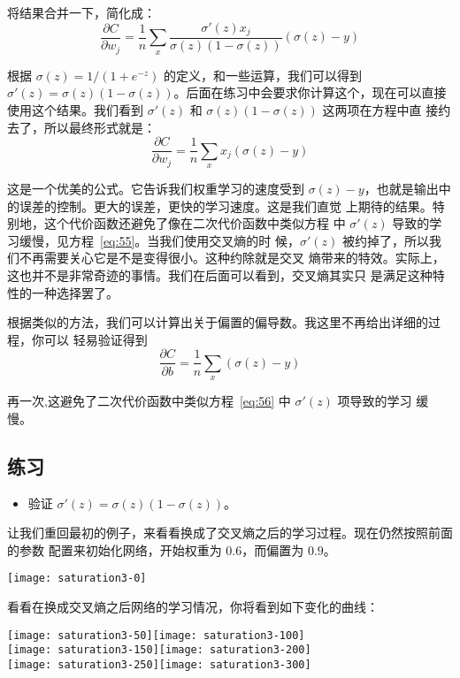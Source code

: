 将结果合并一下，简化成：
\begin{equation}
  \frac{\partial C}{\partial w_j} = \frac{1}{n} \sum_x \frac{\sigma'(z)
    x_j}{\sigma(z) (1-\sigma(z))} (\sigma(z)-y)
\label{eq:60}\tag{60}
\end{equation}

根据 $\sigma(z) = 1/(1+e^{-z})$ 的定义，和一些运算，我们可以得到
$\sigma'(z) = \sigma(z)(1-\sigma(z))$。后面在练习中会要求你计算这个，现在可以直接
使用这个结果。我们看到 $\sigma'(z)$ 和 $\sigma(z)(1-\sigma(z))$ 这两项在方程中直
接约去了，所以最终形式就是：
\begin{equation}
  \frac{\partial C}{\partial w_j} =  \frac{1}{n} \sum_x x_j(\sigma(z)-y)
\label{eq:61}\tag{61}
\end{equation}

这是一个优美的公式。它告诉我们权重学习的速度受到
$\sigma(z)-y$，也就是输出中的误差的控制。更大的误差，更快的学习速度。这是我们直觉
上期待的结果。特别地，这个代价函数还避免了像在二次代价函数中类似方程
中 $\sigma'(z)$ 导致的学习缓慢，见方程~\eqref{eq:55}。当我们使用交叉熵的时
候，$\sigma'(z)$ 被约掉了，所以我们不再需要关心它是不是变得很小。这种约除就是交叉
熵带来的特效。实际上，这也并不是非常奇迹的事情。我们在后面可以看到，交叉熵其实只
是满足这种特性的一种选择罢了。

根据类似的方法，我们可以计算出关于偏置的偏导数。我这里不再给出详细的过程，你可以
轻易验证得到
\begin{equation}
  \frac{\partial C}{\partial b} = \frac{1}{n} \sum_x (\sigma(z)-y)
\label{eq:62}\tag{62}
\end{equation}

再一次,这避免了二次代价函数中类似方程~\eqref{eq:56} 中 $\sigma'(z)$ 项导致的学习
缓慢。

\subsection*{练习}

\begin{itemize}
\item 验证 $\sigma'(z) = \sigma(z)(1-\sigma(z))$。
\end{itemize}

让我们重回最初的例子，来看看换成了交叉熵之后的学习过程。现在仍然按照前面的参数
配置来初始化网络，开始权重为 $0.6$，而偏置为 $0.9$。
\begin{center}
  \texttt{[image: saturation3-0]}
\end{center}
看看在换成交叉熵之后网络的学习情况，你将看到如下变化的曲线：
\begin{center}
  \texttt{[image: saturation3-50]}\texttt{[image: saturation3-100]}\\
  \texttt{[image: saturation3-150]}\texttt{[image: saturation3-200]}\\
  \texttt{[image: saturation3-250]}\texttt{[image: saturation3-300]}
\end{center}

